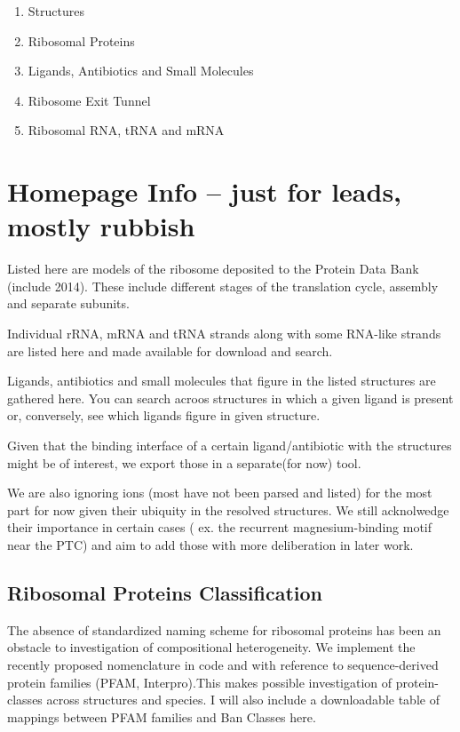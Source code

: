 \documentclass[11pt]{article}
\begin{document}
\begin{enumerate}

\item Structures
\item Ribosomal Proteins
\item Ligands, Antibiotics and Small Molecules
\item Ribosome Exit Tunnel
\item Ribosomal RNA, tRNA and mRNA

\end{enumerate}
    


\section{Homepage Info -- just for leads, mostly rubbish}
Listed here are models of the ribosome deposited to the Protein Data Bank (include 2014). These include different stages of the translation cycle, assembly and separate subunits.


Individual rRNA, mRNA and tRNA strands along with some RNA-like strands are listed here and made available for download and search.

Ligands, antibiotics and small molecules that figure in the listed structures are gathered here. You can search acroos structures in which a given ligand is present or, conversely, see which ligands figure in given structure.

Given that the binding interface of a certain ligand/antibiotic with the structures might be of interest, we export those in a separate(for now) tool.

We are also ignoring ions (most have not been parsed and listed) for the most part for now given their ubiquity in the resolved structures. We still acknolwedge their importance in certain cases ( ex. the recurrent magnesium-binding motif near the PTC) and aim to add those with more deliberation in later work.


\subsection{Ribosomal Proteins Classification}

The absence of standardized naming scheme for ribosomal proteins has been an obstacle to investigation of compositional heterogeneity. We implement the recently proposed nomenclature in code and with reference to sequence-derived protein families (PFAM, Interpro).This makes possible investigation of protein-classes across structures and species.
I will also include a downloadable table of mappings between PFAM families and Ban Classes here.
\end{document}
